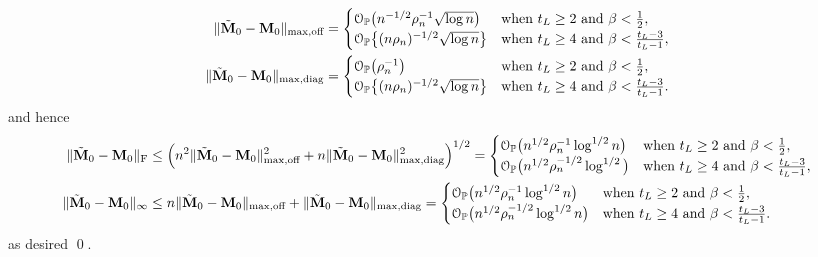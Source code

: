 \documentclass[10pt,journal,compsoc]{IEEEtran}
\newcommand{\op}{\mathcal{O}_{\mathbb{P}}}
\newcommand{\ee}{\end{aligned} \end{equation}}
\newcommand{\BL}{\Big (}
\newcommand{\BR}{\Big )}
\newcommand{\bee}{\begin{equation}\begin{aligned}}
\newcommand{\M}[1]{{{\mathbf{\MakeUppercase{#1}}}}}
\newcommand{\F}{\mathrm{F}}
\numberwithin{equation}{section}
\begin{document}
\bee\nonumber
\|\tilde{\M M}_0 - \M M_0\|_{\max,\text{off}}
&= \begin{cases}
\op\big(n^{-1/2}\rho_n^{-1}\sqrt{\log n}\big) & \text{when } t_L \geq 2 \text{ and }\beta <\frac{1}{2},
\\
\op\big\{(n\rho_n)^{-1/2}\sqrt{\log n}\big\}& \text{when } t_L \geq 4 \text{ and }\beta<\frac{t_L - 3}{t_L - 1},
\end{cases}
\\
\|\tilde{\M M}_0 - \M M_0\|_{\max,\text{diag}}
&= \begin{cases}
\op\big(\rho_n^{-1}\big) & \text{when } t_L \geq 2 \text{ and }\beta <\frac{1}{2},
\\\op\big\{(n\rho_n)^{-1/2}\sqrt{\log n}\big\}& \text{when } t_L \geq 4 \text{ and }\beta<\frac{t_L - 3}{t_L - 1}.
\end{cases}
\ee
and hence
\bee\nonumber
\|\tilde{\M M}_0-\M M_0\|_{\F} 
&\leq  \BL n^2 \|\tilde{\M M}_0 - \M M_0\|^2_{\max,\text{off}} + n \|\tilde{\M M}_0 - \M M_0\|^2_{\max,\text{diag}}  \BR^{1/2}
= \begin{cases}
\op\big(n^{1/2}\rho_n^{-1}\log^{1/2}{n}\big) & \text{when } t_L \geq 2 \text{ and }\beta <\frac{1}{2},
\\\op\big(n^{1/2}\rho_n^{-1/2}\log^{1/2}\big)& \text{when } t_L \geq 4 \text{ and }\beta<\frac{t_L - 3}{t_L - 1},
\end{cases} \\
\label{M0Minfty}
\|\tilde{\M M}_0-\M M_0\|_{\infty}
&\leq   n\|\tilde{\M M}_0 - \M M_0\|_{\max,\text{off}} +  \|\tilde{\M M}_0 - \M M_0\|_{\max,\text{diag}}  
= \begin{cases}
\op\big(n^{1/2}\rho_n^{-1} \log^{1/2}{n} \big) & \text{when } t_L \geq 2 \text{ and }\beta <\frac{1}{2},
\\\op\big(n^{1/2}\rho_n^{-1/2}\log^{1/2}{n}\big)& \text{when } t_L \geq 4 \text{ and }\beta<\frac{t_L - 3}{t_L - 1}.
\end{cases}
\ee
as desired \qed.
\end{document}
